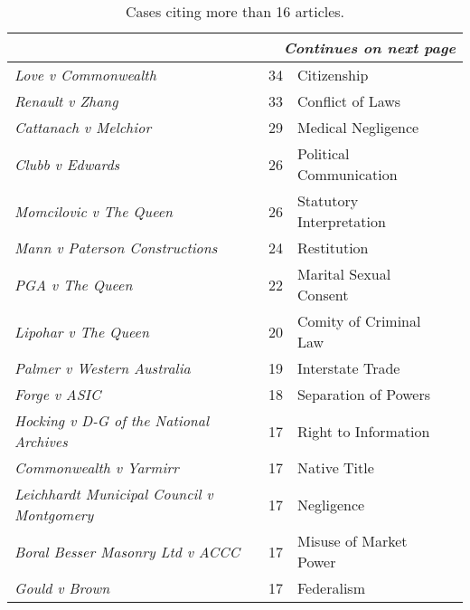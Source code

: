 
\begin{longtable}{llll}
    \caption{Cases citing more than 16 articles.}
    \endfirsthead
    \toprule
    \endhead
    \bottomrule
    \multicolumn{4}{r}{\emph{Continues on next page}}
    \endfoot
    \bottomrule
    \endlastfoot

    \toprule
    {\textbf{Case}}                                                & {\textbf{Count}} & {\textbf{Topic}} \\ \midrule
    {\emph{Love v Commonwealth}\xn{}}                              &  34 & {Citizenship} \\
    {\emph{Renault v Zhang}\xn{}}                                  &  33 & {Conflict of Laws}  \\
    {\emph{Cattanach v Melchior}\xn{}}                             &  29 & {Medical Negligence} \\
    {\emph{Clubb v Edwards}\xn{}}                                  &  26 & {Political Communication} \\
    {\emph{Momcilovic v The Queen}\xn{}}                           &  26 & {Statutory Interpretation}  \\ \midrule
    {\emph{Mann v Paterson Constructions}\xn{}}                    &  24 & {Restitution} \\
    {\emph{PGA v The Queen}\xn{}}                                  &  22 & {Marital Sexual Consent} \\
    {\emph{Lipohar v The Queen}\xn{}}                              &  20 & {Comity of Criminal Law}  \\
    {\emph{Palmer v Western Australia}\xn{}}                       &  19 & {Interstate Trade} \\
    {\emph{Forge v ASIC}\xn{}}                                     &  18 & {Separation of Powers}  \\ \midrule
    {\emph{Hocking v D-G of the National Archives}\xn{}}           &  17 & {Right to Information} \\
    {\emph{Commonwealth v Yarmirr}\xn{}}                           &  17 & {Native Title} \\
    {\emph{Leichhardt Municipal Council v Montgomery}\xn{}}        &  17 & {Negligence} \\
    {\emph{Boral Besser Masonry Ltd v ACCC}\xn{}}                  &  17 & {Misuse of Market Power} \\
    {\emph{Gould v Brown}\xn{}}                                    &  17 & {Federalism}  \\
\end{longtable}
